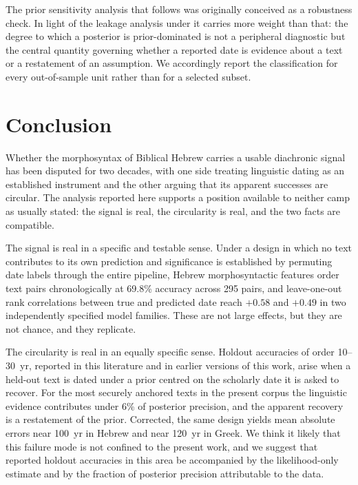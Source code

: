 The prior sensitivity analysis that follows was originally conceived as a
robustness check.  In light of the leakage analysis under
 it carries more weight than that: the degree to
which a posterior is prior-dominated is not a peripheral diagnostic but the
central quantity governing whether a reported date is evidence about a text
or a restatement of an assumption.  We accordingly report the
classification for every out-of-sample unit rather than for a selected
subset.

\section*{Conclusion}

Whether the morphosyntax of Biblical Hebrew carries a usable diachronic
signal has been disputed for two decades, with one side treating linguistic
dating as an established instrument and the other arguing that its apparent
successes are circular.  The analysis reported here supports a position
available to neither camp as usually stated: the signal is real, the
circularity is real, and the two facts are compatible.

The signal is real in a specific and testable sense.  Under a design in
which no text contributes to its own prediction and significance is
established by permuting date labels through the entire pipeline, Hebrew
morphosyntactic features order text pairs chronologically at 69.8\%
accuracy across 295 pairs, and leave-one-out rank correlations between true
and predicted date reach $+0.58$ and $+0.49$ in two independently
specified model families.  These are not large effects, but they are not
chance, and they replicate.

The circularity is real in an equally specific sense.  Holdout accuracies
of order 10--30~yr, reported in this literature and in earlier versions of
this work, arise when a held-out text is dated under a prior centred on the
scholarly date it is asked to recover.  For the most securely anchored
texts in the present corpus the linguistic evidence contributes under 6\%
of posterior precision, and the apparent recovery is a restatement of the
prior.  Corrected, the same design yields mean absolute errors near 100~yr
in Hebrew and near 120~yr in Greek.  We think it likely that this failure
mode is not confined to the present work, and we suggest that reported
holdout accuracies in this area be accompanied by the likelihood-only
estimate and by the fraction of posterior precision attributable to the
data.

